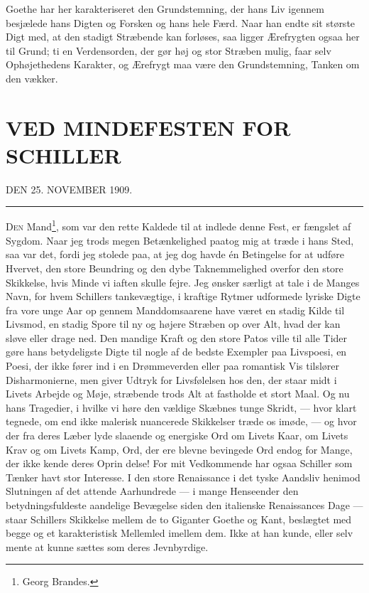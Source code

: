 \documentclass[12pt,a4paper,openany]{book}
\newcommand{\opage}[1]{\marginnote{\footnotesize\textit{[#1]}}}
\newcommand{\essay}[2][]{\chapter*{#2}\addcontentsline{toc}{chapter}{#1}}   %
\newcommand{\undertitel}[1]{\begin{center}\small #1\end{center}}   %
\newcommand{\streg}{\begin{center}\rule{3em}{0.4pt}\end{center}}
\begin{document}
Goethe har her karakteriseret den Grundstemning, der hans
Liv igennem besjælede hans Digten og Forsken og hans hele
Færd. Naar han endte sit største Digt med, at den stadigt Stræbende
kan forløses, saa ligger Ærefrygten ogsaa her til Grund;
ti en Verdensorden, der gør høj og stor Stræben mulig, faar
selv Ophøjethedens Karakter, og Ærefrygt maa være den Grundstemning,
Tanken om den vækker.

\setcounter{footnote}{0}%
\opage{176}\essay[Ved Schillerfesten (1909)]{VED MINDEFESTEN FOR SCHILLER}
\undertitel{DEN 25. NOVEMBER 1909.}
\streg

D\textsc{en} Mand\footnote[1]{Georg Brandes.}, som var den rette Kaldede til at indlede denne
Fest, er fængslet af Sygdom. Naar jeg trods megen Betænkelighed
paatog mig at træde i hans Sted, saa var det, fordi
jeg stolede paa, at jeg dog havde én Betingelse for at udføre
Hvervet, den store Beundring og den dybe Taknemmelighed
overfor den store Skikkelse, hvis Minde vi iaften skulle fejre.
Jeg ønsker særligt at tale i de Manges Navn, for hvem Schillers
tankevægtige, i kraftige Rytmer udformede lyriske Digte
fra vore unge Aar op gennem Manddomsaarene have været en
stadig Kilde til Livsmod, en stadig Spore til ny og højere
Stræben op over Alt, hvad der kan sløve eller drage ned.
Den mandige Kraft og den store Patos ville til alle Tider gøre
hans betydeligste Digte til nogle af de bedste Exempler paa
Livspoesi, en Poesi, der ikke fører ind i en Drømmeverden
eller paa romantisk Vis tilslører Disharmonierne, men giver
Udtryk for Livsfølelsen hos den, der staar midt i Livets Arbejde
og Møje, stræbende trods Alt at fastholde et stort Maal.
Og nu hans Tragedier, i hvilke vi høre den vældige Skæbnes
tunge Skridt, --- hvor klart tegnede, om end ikke malerisk
nuancerede Skikkelser træde os imøde, --- og hvor der fra
deres Læber lyde slaaende og energiske Ord om Livets Kaar,
om Livets Krav og om Livets Kamp, Ord, der ere blevne bevingede
Ord endog for Mange, der ikke kende deres Oprin%
\setcounter{footnote}{0}%
\opage{177}delse! For mit Vedkommende har ogsaa Schiller som Tænker
havt stor Interesse. I den store Renaissance i det tyske Aandsliv
henimod Slutningen af det attende Aarhundrede --- i mange
Henseender den betydningsfuldeste aandelige Bevægelse siden
den italienske Renaissances Dage --- staar Schillers Skikkelse
mellem de to Giganter Goethe og Kant, beslægtet med begge
og et karakteristisk Mellemled imellem dem. Ikke at han
kunde, eller selv mente at kunne sættes som deres Jevnbyrdige.
\end{document}
